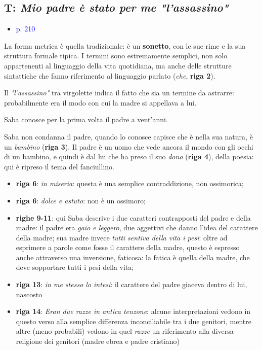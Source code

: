 \documentclass[a4paper, twoside, titlepage]{book}
\newcommand{\elenco}[1]{%
\begin{itemize}
#1
\end{itemize}}
\renewcommand{\emph}[1]{\textcolor{blue}{#1}}
\begin{document}
\subsection{T: \textit{Mio padre è stato per me "l'assassino"}}
\elenco{\item \emph{p. 210}}

La forma metrica è quella tradizionale: è un \textbf{sonetto}, con le sue rime e la sua struttura formale tipica. I termini sono estremamente semplici, non solo appartenenti al linguaggio della vita quotidiana, ma anche delle strutture sintattiche che fanno riferimento al linguaggio parlato (\textit{che}, \textbf{riga 2}).

Il \textit{"l'assassino"} tra virgolette indica il fatto che sia un termine da astrarre: probabilmente era il modo con cui la madre si appellava a lui.

Saba conosce per la prima volta il padre a vent'anni.

Saba non condanna il padre, quando lo conosce capisce che è nella sua natura, è un \textit{bambino} (\textbf{riga 3}). Il padre è un uomo che vede ancora il mondo con gli occhi di un bambino, e quindi è dal lui che ha preso il suo \textit{dono} (\textbf{riga 4}), della poesia: qui è ripreso il tema del fanciullino.

\elenco{
	\item \textbf{riga 6}: \textit{in miseria}: questa è una semplice contraddizione, non ossimorica;
	\item \textbf{riga 6}: \textit{dolce e astuto}: non è un ossimoro;
	\item \textbf{righe 9-11}: qui Saba descrive i due caratteri contrapposti del padre e della madre: il padre era \textit{gaio e leggero}, due aggettivi che danno l'idea del carattere della madre; sua madre invece \textit{tutti sentiva della vita i pesi}: oltre ad esprimere a parole come fosse il carattere della madre, questo è espresso anche attraverso una inversione, faticosa: la fatica è quella della madre, che deve sopportare tutti i pesi della vita;
	\item \textbf{riga 13}: \textit{in me stesso lo intesi}: il carattere del padre giaceva dentro di lui, nascosto
	\item \textbf{riga 14}: \textit{Eran due razze in antica tenzone}: alcune interpretazioni vedono in questo verso alla semplice differenza inconciliabile tra i due genitori, mentre altre (meno probabili) vedono in quel \textit{razze} un riferimento alla diversa religione dei genitori (madre ebrea e padre cristiano)}
\end{document}
